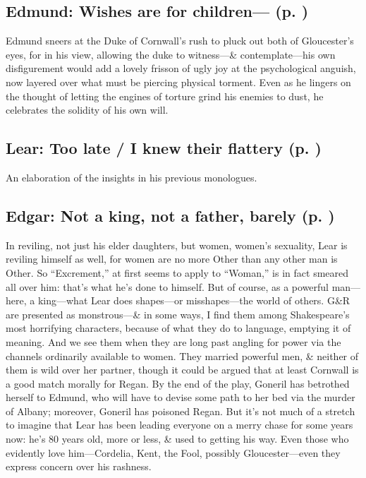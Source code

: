 \subsection*{Edmund: Wishes are for children--- (p. \pageref{ch:lear_ay})}
Edmund sneers at the Duke of Cornwall's rush to pluck out both of Gloucester's eyes, for in his view, allowing the duke to witness---\& contemplate---his own disfigurement would add a lovely frisson of ugly joy at the psychological anguish, now layered over what must be piercing physical torment. Even as he lingers on the thought of letting the engines of torture grind his enemies to dust, he celebrates the solidity of his own will.

\subsection*{Lear: Too late / I knew their flattery (p. \pageref{ch:lear_az})}
An elaboration of the insights in his previous monologues.

\subsection*{Edgar: Not a king, not a father, barely (p. \pageref{ch:lear_ba})}
In reviling, not just his elder daughters, but women, women's sexuality, Lear is reviling himself as well, for women are no more Other than any other man is Other. So ``Excrement,'' at first seems to apply to ``Woman,'' is in fact smeared all over him: that's what he's done to himself. But of course, as a powerful man---here, a king---what Lear does shapes---or misshapes---the world of others. G\&R are presented as monstrous---\& in some ways, I find them among Shakespeare's most horrifying characters, because of what they do to language, emptying it of meaning. And we see them when they are long past angling for power via the channels ordinarily available to women. They married powerful men, \& neither of them is wild over her partner, though it could be argued that at least Cornwall is a good match morally for Regan. By the end of the play, Goneril has betrothed herself to Edmund, who will have to devise some path to her bed via the murder of Albany; moreover, Goneril has poisoned Regan. But it's not much of a stretch to imagine that Lear has been leading everyone on a merry chase for some years now: he's 80 years old, more or less, \& used to getting his way. Even those who evidently love him---Cordelia, Kent, the Fool, possibly Gloucester---even they express concern over his rashness.

